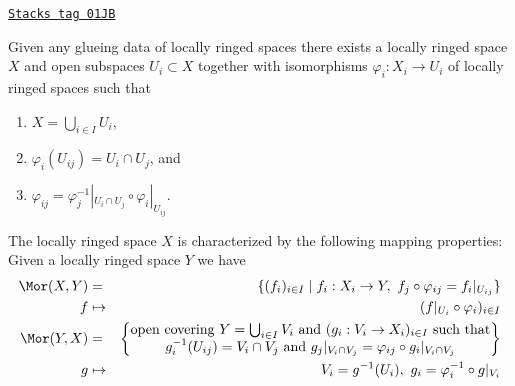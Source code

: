 \begin{lemma}
\label{schemes-lemma-glue}
\href{https://stacks.math.columbia.edu/tag/01JB}{\texttt{Stacks tag 01JB}}


Given any glueing data of locally ringed spaces there
exists a locally ringed space $X$ and open subspaces
$U_i \subset X$ together with isomorphisms
$\varphi_i : X_i \to U_i$ of locally ringed spaces such that
\begin{enumerate}
\item $X=\bigcup_{i\in I} U_i$,
\item $\varphi_i(U_{ij}) = U_i \cap U_j$, and
\item $\varphi_{ij} =
\varphi_j^{-1}|_{U_i \cap U_j} \circ \varphi_i|_{U_{ij}}$.
\end{enumerate}
The locally ringed space $X$ is characterized by the following
mapping properties: Given a locally ringed space $Y$ we have
\begin{eqnarray*}
\Mor(X, Y) & = & \{ (f_i)_{i\in I} \mid
f_i : X_i \to Y, \ f_j \circ \varphi_{ij} = f_i|_{U_{ij}}\} \\
f & \mapsto & (f|_{U_i} \circ \varphi_i)_{i \in I} \\
\Mor(Y, X) & = &
\left\{
\begin{matrix}
\text{open covering }Y = \bigcup\nolimits_{i \in I} V_i\text{ and }
(g_i : V_i \to X_i)_{i \in I}
\text{ such that}\\
g_i^{-1}(U_{ij}) = V_i \cap V_j
\text{ and }
g_j|_{V_i \cap V_j} = \varphi_{ij} \circ g_i|_{V_i \cap V_j}
\end{matrix}
\right\} \\
g & \mapsto &
V_i = g^{-1}(U_i), \ g_i = \varphi_i^{-1} \circ g|_{V_i}
\end{eqnarray*}
\end{lemma}

